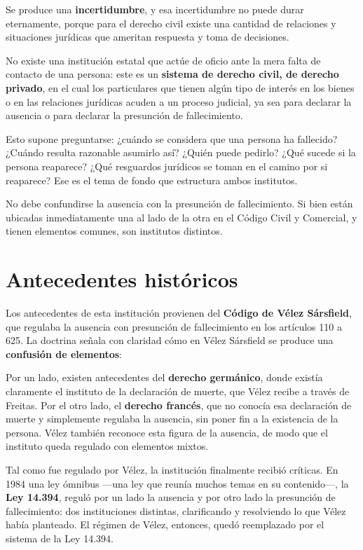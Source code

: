 \documentclass[12pt,oneside]{book}
\begin{document}
Se produce una \textbf{incertidumbre}, y esa incertidumbre no puede durar
eternamente, porque para el derecho civil existe una cantidad de
relaciones y situaciones jurídicas que ameritan respuesta y toma de
decisiones.

No existe una institución estatal que actúe de oficio ante la mera falta
de contacto de una persona: este es un \textbf{sistema de derecho civil,
de derecho privado}, en el cual los particulares que tienen algún tipo de
interés en los bienes o en las relaciones jurídicas acuden a un proceso
judicial, ya sea para declarar la ausencia o para declarar la presunción
de fallecimiento.

Esto supone preguntarse: ¿cuándo se considera que una persona ha
fallecido? ¿Cuándo resulta razonable asumirlo así? ¿Quién puede pedirlo?
¿Qué sucede si la persona reaparece? ¿Qué resguardos jurídicos se toman en
el camino por si reaparece? Ese es el tema de fondo que estructura ambos
institutos.

\begin{important}
No debe confundirse la ausencia con la presunción de fallecimiento. Si
bien están ubicadas inmediatamente una al lado de la otra en el Código
Civil y Comercial, y tienen elementos comunes, son institutos distintos.
\end{important}

\section{Antecedentes históricos}

Los antecedentes de esta institución provienen del \textbf{Código de
Vélez Sársfield}, que regulaba la ausencia con presunción de fallecimiento
en los artículos 110 a 625. La doctrina señala con claridad cómo en Vélez
Sársfield se produce una \textbf{confusión de elementos}:

Por un lado, existen antecedentes del \textbf{derecho germánico}, donde
existía claramente el instituto de la declaración de muerte, que Vélez
recibe a través de Freitas. Por el otro lado, el \textbf{derecho
francés}, que no conocía esa declaración de muerte y simplemente regulaba
la ausencia, sin poner fin a la existencia de la persona. Vélez también
reconoce esta figura de la ausencia, de modo que el instituto queda
regulado con elementos mixtos.

Tal como fue regulado por Vélez, la institución finalmente recibió
críticas. En 1984 una ley ómnibus —una ley que reunía muchos temas en su
contenido—, la \textbf{Ley 14.394}, reguló por un lado la ausencia y por
otro lado la presunción de fallecimiento: dos instituciones distintas,
clarificando y resolviendo lo que Vélez había planteado. El régimen de
Vélez, entonces, quedó reemplazado por el sistema de la Ley 14.394.
\end{document}
